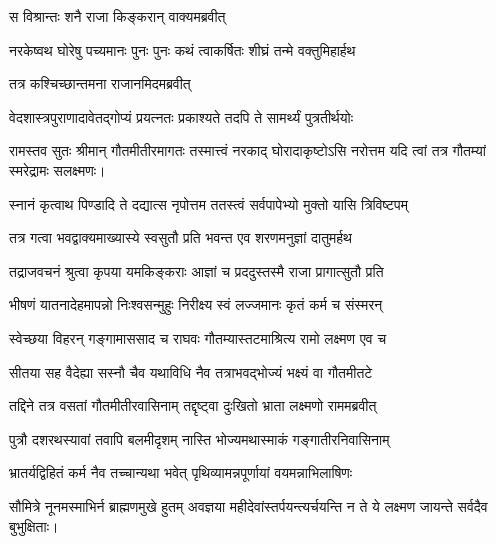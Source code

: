 \onelineshloka
{स विश्रान्तः शनै राजा किङ्करान् वाक्यमब्रवीत्}%



\twolineshloka
{नरकेष्वथ घोरेषु पच्यमानः पुनः पुनः}
{कथं त्वाकर्षितः शीघ्रं तन्मे वक्तुमिहार्हथ} %



\onelineshloka
{तत्र कश्चिच्छान्तमना राजानमिदमब्रवीत्}%



\twolineshloka
{वेदशास्त्रपुराणादावेतद्गोप्यं प्रयत्नतः}
{प्रकाश्यते तदपि ते सामर्थ्यं पुत्रतीर्थयोः} %

\twolineshloka
{रामस्तव सुतः श्रीमान् गौतमीतीरमागतः}
{तस्मात्त्वं नरकाद् घोरादाकृष्टोऽसि नरोत्तम} %
यदि त्वां तत्र गौतम्यां स्मरेद्रामः सलक्ष्मणः।

\twolineshloka
{स्नानं कृत्वाथ पिण्डादि ते दद्यात्स नृपोत्तम}
{ततस्त्वं सर्वपापेभ्यो मुक्तो यासि त्रिविष्टपम्} %



\twolineshloka
{तत्र गत्वा भवद्वाक्यमाख्यास्ये स्वसुतौ प्रति}
{भवन्त एव शरणमनुज्ञां दातुमर्हथ} %



\twolineshloka
{तद्राजवचनं श्रुत्वा कृपया यमकिङ्कराः}
{आज्ञां च प्रददुस्तस्मै राजा प्रागात्सुतौ प्रति} %

\twolineshloka
{भीषणं यातनादेहमापन्नो निःश्वसन्मुहुः}
{निरीक्ष्य स्वं लज्जमानः कृतं कर्म च संस्मरन्} %

\twolineshloka
{स्वेच्छया विहरन् गङ्गामाससाद च राघवः}
{गौतम्यास्तटमाश्रित्य रामो लक्ष्मण एव च} %

\twolineshloka
{सीतया सह वैदेह्या सस्नौ चैव यथाविधि}
{नैव तत्राभवद्भोज्यं भक्ष्यं वा गौतमीतटे} %

\twolineshloka
{तद्दिने तत्र वसतां गौतमीतीरवासिनाम्}
{तद्दृष्ट्वा दुःखितो भ्राता लक्ष्मणो राममब्रवीत्} %



\twolineshloka
{पुत्रौ दशरथस्यावां तवापि बलमीदृशम्}
{नास्ति भोज्यमथास्माकं गङ्गातीरनिवासिनाम्} %



\twolineshloka
{भ्रातर्यद्विहितं कर्म नैव तच्चान्यथा भवेत्}
{पृथिव्यामन्नपूर्णायां वयमन्नाभिलाषिणः} %

\twolineshloka
{सौमित्रे नूनमस्माभिर्न ब्राह्मणमुखे हुतम्}
{अवज्ञया महीदेवांस्तर्पयन्त्यर्चयन्ति न} %
ते ये लक्ष्मण जायन्ते सर्वदैव बुभुक्षिताः।

